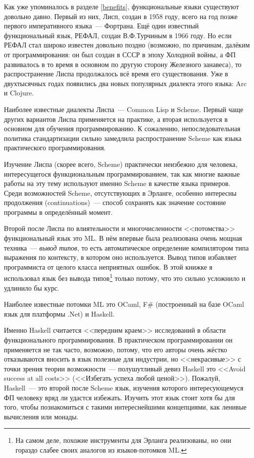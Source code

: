 \documentclass[
  paper=a4,
  fontsize=14pt,
  openany,
  appendixprefix=true
]{scrbook}
\begin{document}
Как уже упоминалось в разделе \ref{benefits}, функциональные языки существуют довольно давно. Первый из них, Лисп, создан в 1958 году, всего на год позже первого императивного языка~--- Фортрана. Ещё один известный функциональный язык, РЕФАЛ, создан В.Ф.Турчиным в 1966 году. Но если РЕФАЛ стал широко известен довольно поздно (возможно, по причинам, далёким от программирования: он был создан в СССР в эпоху Холодной войны, а ФП развивалось в то время в основном по другую сторону Железного занавеса), то распространение Лиспа продолжалось всё время его существования. Уже в двухтысячных годах появились два новых популярных диалекта этого языка: Arc и Clojure.

Наиболее известные диалекты Лиспа~--- Common Lisp и Scheme. Первый чаще других вариантов Лиспа применяется на практике, а вторая используется в основном для обучения программированию. К сожалению, непоследовательная политика стандартизации сильно замедлила распространение Scheme как языка практического программирования.

Изучение Лиспа (скорее всего, Scheme) практически неизбежно для человека, интересущегося функциональным программированием, так как многие важные работы на эту тему используют именно Scheme в качестве языка примеров. Среди возможностей Scheme, отсутствующих в Эрланге, особенно интересны  продолжения (continuations)~--- способ сохранять как значение состояние программы в определённый момент.

Второй после Лиспа по влиятельности и многочисленности <<потомства>> функциональный язык это ML. В нём впервые была реализована очень мощная техника~--- {\em вывод типов}, то есть автоматическое определение компилятором типа выражения по контексту, в котором оно используется. Вывод типов избавляет программиста от целого класса неприятных ошибок. В этой книжке я использовал язык без вывода типов\footnote{На самом деле, похожие инструменты для Эрланга реализованы, но они гораздо слабее своих аналогов из языков-потомков ML.} только потому, что это сильно усложнило и удлинило бы курс.

Наиболее известные потомки ML это OCaml, F\# (построенный на базе OCaml язык для платформы .Net) и Haskell.

Именно Haskell считается <<передним краем>> исследований в области функционального программирования. В практическом программировании он применяется не так часто, возможно, потому, что его авторы очень жёстко отказываются вносить в язык полезные для индустрии, но <<некрасивые>> с точки зрения теории возможности~--- полушутливый девиз Haskell это <<Avoid success at all costs>> (<<Избегать успеха любой ценой>>). Пожалуй, Haskell~--- это второй после Scheme язык, изучения которого интересующемуся ФП человеку вряд ли удастся избежать. Изучить этот язык стоит хотя бы для того, чтобы познакомиться с такими интереснейшими концепциями, как ленивые вычисления или монады.
\end{document}
